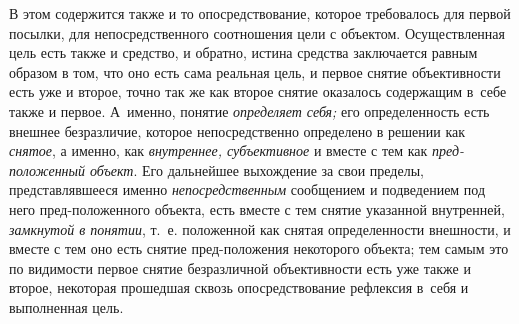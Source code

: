 В этом содержится также и то опосредствование, которое
требовалось для первой посылки, для непосредственного соотношения цели с
объектом. Осуществленная цель есть также и средство, и обратно, истина
средства заключается равным образом в том, что оно есть сама реальная цель,
и первое снятие объективности есть уже и второе, точно так же как второе
снятие оказалось содержащим в~себе также и первое. А~именно, понятие
{\em определяет себя;} его определенность есть внешнее безразличие, которое
непосредственно определено в решении как {\em снятое}, а именно,
как {\em внутреннее, субъективное} и вместе с тем как {\em пред-положенный
объект}. Его дальнейшее выхождение за свои пределы, представлявшееся именно
{\em непосредственным}
сообщением и подведением под него пред-положенного объекта,
есть вместе с тем снятие указанной внутренней, {\em замкнутой в понятии},
т.~е. положенной как снятая определенности внешности, и
вместе с тем оно есть снятие пред-положения некоторого объекта; тем самым
это по видимости первое снятие безразличной объективности
есть уже также и второе, некоторая прошедшая сквозь опосредствование
рефлексия в~себя и выполненная цель.

